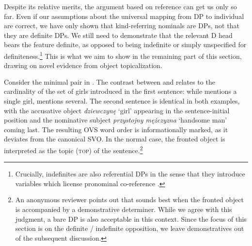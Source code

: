 \documentclass[output=paper]{langscibook}
\begin{document}
\ea {}
\label{ex:bookshelf_1}

 \label{ex:bookshelf_2}
\z \z

\noindent
Despite its relative merits, the argument based on reference can get us only so far. Even if our assumptions about the universal mapping from DP to individual are correct, we have only shown that kind-referring nominals are DPs, not that they are definite DPs. We still need to demonstrate that the relevant D head bears the feature definite, as opposed to being indefinite or simply unspecified for definiteness.\footnote{Crucially, indefinites are also referential DPs in the sense that they introduce variables which license pronominal co-reference \citep{Heim1982, Kamp.Reyle1993}.} This is what we aim to show in the remaining part of this section, drawing on novel evidence from object topicalization.

Consider the minimal pair in . The contrast between  and  relates to the cardinality of the set of girls introduced in the first sentence: while  mentions a single girl,  mentions several. The second sentence is identical in both examples, with the accusative object \textit{dziewczynę} `girl' appearing in the sentence-initial position and the nominative subject \textit{przystojny mężczyzna} `handsome man' coming last. The resulting OVS word order is informationally marked, as it deviates from the canonical  SVO. In the normal case, the fronted object is interpreted as the topic (\textsc{top}) of the sentence.\footnote{An anonymous reviewer points out that  sounds best when the fronted object is accompanied by a demonstrative determiner. While we agree with this judgment, a bare DP is also acceptable in this context. Since the focus of this section is on the definite / indefinite opposition, we leave demonstratives out of the subsequent discussion.}
\largerpage[-1] %
\end{document}
